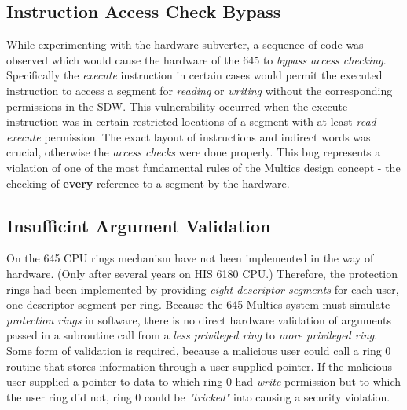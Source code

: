 \subsection{Instruction Access Check Bypass}

While experimenting with the hardware subverter, a sequence of code was observed which would cause the hardware 
of the 645 to \textit{bypass access checking}. Specifically the \textit{execute} instruction in certain cases 
would permit the executed instruction to access a segment for \textit{reading} or \textit{writing} without the 
corresponding permissions in the SDW.
This vulnerability occurred when the execute instruction was in certain restricted locations of a segment with 
at least \textit{read-execute} permission.
The exact layout of instructions and indirect words was crucial, otherwise the \textit{access checks} were done 
properly.
This bug represents a violation of one of the most fundamental rules of the Multics design concept - the checking 
of \textbf{every} reference to a segment by the hardware.


\subsection{Insufficint Argument Validation}

On the 645 CPU rings mechanism have not been implemented in the way of hardware. (Only after several years on HIS 6180 CPU.) 
Therefore, the protection rings had been implemented by providing \textit{eight descriptor segments} for each user, one 
descriptor segment per ring.
Because the 645 Multics system must simulate \textit{protection rings} in software, there is no direct hardware 
validation of arguments passed in a subroutine call from a \textit{less privileged ring} to \textit{more 
privileged ring}. Some form of validation is required, because a malicious user could call a ring 0 routine 
that stores information through a user supplied pointer.
If the malicious user supplied a pointer to data to which ring 0 had \textit{write} permission but to which the 
user ring did not, ring 0 could be \textit{"tricked"} into causing a security violation.

